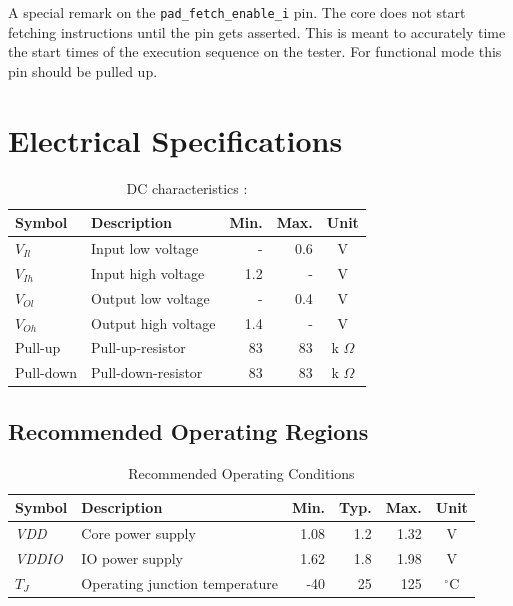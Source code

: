   A special remark on the \verb+pad_fetch_enable_i+ pin. The core does not start fetching instructions until the pin gets asserted. This is meant to accurately time the start times of the execution sequence on the tester. For functional mode this pin should be pulled up.

\FloatBarrier

\section{Electrical Specifications}

\begin{table}[htbp]
 \caption[DC characteristics]{DC characteristics \cite{faraday}:} \label{tab:elect_rec}
\centering
\begin{tabularx}{\textwidth}{|l|X|r|r|c|} 
 \hline
  Symbol & Description & Min. & Max. & Unit \\ \hline
  $V_{Il}$ & Input low voltage & - & 0.6 & V \\ \hline
  $V_{Ih}$ & Input high voltage & 1.2 & - & V \\ \hline
  $V_{Ol}$ & Output low voltage & - & 0.4 & V \\ \hline
  $V_{Oh}$ & Output high voltage & 1.4 & - & V \\ \hline
  Pull-up & Pull-up-resistor & 83 & 83 & k $\Omega$ \\ \hline
  Pull-down & Pull-down-resistor & 83 & 83 & k $\Omega$ \\ \hline
 \end{tabularx}
 \end{table}

\subsection{Recommended Operating Regions}
\begin{table}[htbp]
 \caption[Recommended Operating Conditions]{Recommended Operating Conditions \cite{faraday}}
 \label{tab:elect_rec}
\centering\begin{tabularx}{\textwidth}{|l|X|r|r|r|c|} \hline
Symbol & Description & Min. & Typ. & Max. & Unit \\ \hline
\textit{VDD} & Core power supply & 1.08 & 1.2 & 1.32 & V \\ \hline
\textit{VDDIO} & IO power supply & 1.62 & 1.8 & 1.98 & V \\ \hline
$T_J$ & Operating junction temperature & -40 & 25 & 125 &  $^\circ$C \\ \hline
 \end{tabularx}
 \end{table}

